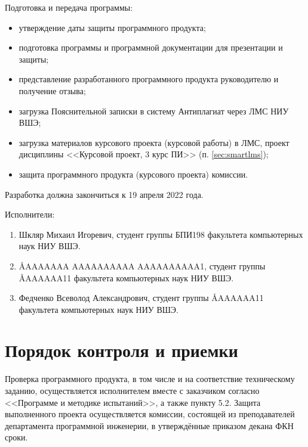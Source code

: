 \documentclass[a4paper,12pt,reqno]{article}
\begin{document}
  Подготовка и передача программы:
  \begin{itemize}
    \item утверждение даты защиты программного продукта;
    \item подготовка программы и программной документации для презентации и защиты;
    \item представление разработанного программного продукта руководителю и получение отзыва;
    \item загрузка Пояснительной записки в систему Антиплагиат через ЛМС НИУ ВШЭ;
    \item загрузка материалов курсового проекта (курсовой работы) в ЛМС, проект дисциплины <<Курсовой проект, 3 курс ПИ>> (п. \ref{sec:smartlms});
    \item защита программного продукта (курсового проекта) комиссии.
  \end{itemize}
  Разработка должна закончиться к 19 апреля 2022 года.

  Исполнители:
  \begin{enumerate}
    \item Шкляр Михаил Игоревич, студент группы БПИ198 факультета компьютерных наук НИУ ВШЭ.
    \item \AA{AAAAAAA AAAAAAAAAA AAAAAAAAAA}{1}, студент группы \AA{AAAAAA}{11} факультета компьютерных наук НИУ ВШЭ.
    \item Федченко Всеволод Александрович, студент группы \AA{AAAAAA}{11} факультета компьютерных наук НИУ ВШЭ.
  \end{enumerate}

  \section{Порядок контроля и приемки}
  Проверка программного продукта, в том числе и на соответствие техническому заданию,
  осуществляется исполнителем вместе с заказчиком согласно <<Программе и методике испытаний>>, а также пункту 5.2.
  Защита выполненного проекта осуществляется комиссии, состоящей из преподавателей департамента программной инженерии,
  в утверждённые приказом декана ФКН сроки.

  \begin{CRTbibliography}
  \end{CRTbibliography}

  \CRTlistRegistration
\end{document}
